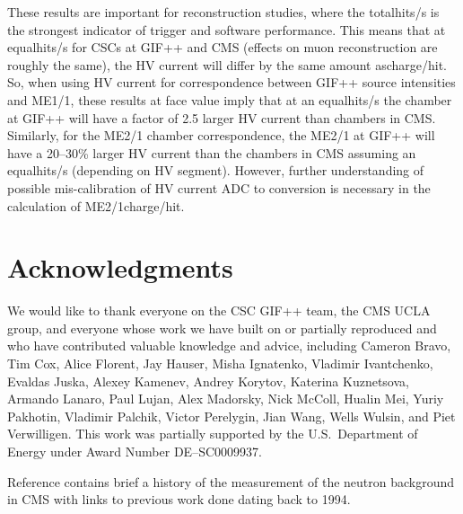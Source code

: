 These results are important for reconstruction studies, where the total\unit{hits/s} is the strongest indicator of trigger and software performance. This means that at equal\unit{hits/s} for CSCs at GIF++ and CMS (effects on muon reconstruction are roughly the same), the HV current will differ by the same amount as\unit{charge/hit}. So, when using HV current for correspondence between GIF++ source intensities and ME1/1, these results at face value imply that at an equal\unit{hits/s} the chamber at GIF++ will have a factor of 2.5 larger HV current than chambers in CMS. Similarly, for the ME2/1 chamber correspondence, the ME2/1 at GIF++ will have a 20--30\% larger HV current than the chambers in CMS assuming an equal\unit{hits/s} (depending on HV segment). However, further understanding of possible mis-calibration of HV current ADC to \muA conversion is necessary in the calculation of ME2/1\unit{charge/hit}. 

\section{Acknowledgments}
\label{sec:acknowledgments}

	We would like to thank everyone on the CSC GIF++ team, the CMS UCLA group, and everyone whose work we have built on or partially reproduced and who have contributed valuable knowledge and advice, including Cameron Bravo, Tim Cox, Alice Florent, Jay Hauser, Misha Ignatenko, Vladimir Ivantchenko, Evaldas Juska, Alexey Kamenev, Andrey Korytov, Katerina Kuznetsova, Armando Lanaro, Paul Lujan, Alex Madorsky, Nick McColl, Hualin Mei, Yuriy Pakhotin, Vladimir Palchik, Victor Perelygin, Jian Wang, Wells Wulsin, and Piet Verwilligen. This work was partially supported by the U.S.\ Department of Energy under Award Number {DE}--{SC}0009937.

Reference \cite{PietsPage} contains brief a history of the measurement of the neutron background in CMS with links to previous work done dating back to 1994.
